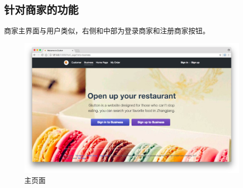 \documentclass[12pt, oneside,a4paper]{article}
\begin{document}
 \subsection{针对商家的功能}
 商家主界面与用户类似，右侧和中部为登录商家和注册商家按钮。
 \begin{figure}[H]
   \centering
     \includegraphics[width=6.00in]{re-front.png}
     \caption{\small{主页面}}
  \end{figure}
\end{document}
